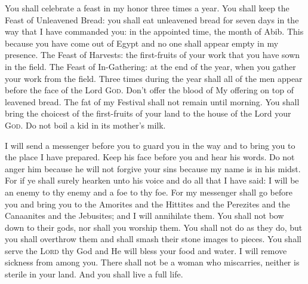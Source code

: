 \begin{inparaenum}
     You shall celebrate a feast in my honor three times a year.%
     You shall keep the Feast of Unleavened Bread: you shall eat unleavened bread for seven days in the way that I have commanded you: in the appointed time, the month of Abib. This because you have come out of Egypt and no one shall appear empty in my presence.%
     The Feast of Harvests: the first-fruits of your work that you have sown in the field. The Feast of In-Gathering: at the end of the year, when you gather your work from the field.%
     Three times during the year shall all of the men appear before the face of the Lord \textsc{God}.%
     Don't offer the blood of My offering on top of leavened bread. The fat of my Festival shall not remain until morning.%
     You shall bring the choicest of the first-fruits of your land to the house of the Lord your \textsc{God}. Do not boil a kid in its mother's milk.%
    
     I will send a messenger before you to guard you in the way and to bring you to the place I have prepared.%
     Keep his face before you and hear his words. Do not anger him because he will not forgive your sins because my name is in his midst.%
     For if ye shall surely hearken unto his voice and do all that I have said: I will be an enemy to thy enemy and a foe to thy foe.%
     For my messenger shall go before you and bring you to the Amorites and the Hittites and the Perezites and the Canaanites and the Jebusites; and I will annihilate them.%
     You shall not bow down to their gods, nor shall you worship them. You shall not do as they do, but you shall overthrow them and shall smash their stone images to pieces.%
     You shall serve the \textsc{Lord} thy God and He will bless your food and water. I will remove sickness from among you.%
     There shall not be a woman who miscarries, neither is sterile in your land. And you shall live a full life.%
    

\end{inparaenum}
